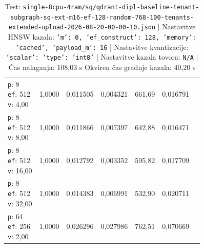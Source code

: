 \begin{table}[htbp]
\begin{tabularx}{\textwidth}{Xrrrrrr}
    \makecell{\texttt{p}: 8\\\texttt{ef}: 512\\\texttt{v}: 4,00} & 1,0000 & 0,011505 & 0,004321 & 661,69 & 0,016791 \\
    \makecell{\texttt{p}: 8\\\texttt{ef}: 512\\\texttt{v}: 8,00} & 1,0000 & 0,011866 & 0,007397 & 642,88 & 0,016471 \\
    \makecell{\texttt{p}: 8\\\texttt{ef}: 512\\\texttt{v}: 16,00} & 1,0000 & 0,012792 & 0,003352 & 595,82 & 0,017709 \\
    \makecell{\texttt{p}: 8\\\texttt{ef}: 512\\\texttt{v}: 32,00} & 1,0000 & 0,014383 & 0,006991 & 532,90 & 0,020711 \\
    \makecell{\texttt{p}: 64\\\texttt{ef}: 256\\\texttt{v}: 2,00} & 1,0000 & 0,026296 & 0,027986 & 762,51 & 0,070669 \\
    \bottomrule
  \end{tabularx}
\caption* {Test: \texttt{single-8cpu-4ram/sq/qdrant-dipl-baseline-tenant-subgraph-sq-ext-m16-ef-128-random-768-100-tenants-extended-upload-2026-08-20-00-00-10.json} | Nastavitve HNSW kazala: \texttt{{'m': 0, 'ef\_construct': 128, 'memory': 'cached', 'payload\_m': 16}} | Nastavitve kvantizacije: \texttt{{'scalar': {'type': 'int8'}}} | Nastavitve kazala tovora: \texttt{N/A} | Čas nalaganja: 108,03 s Okviren čas gradnje kazala: 40,20 s}\end{table}


